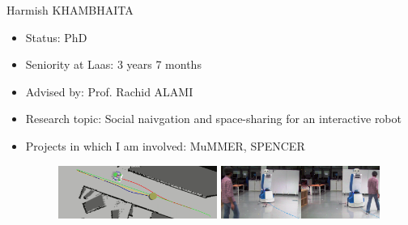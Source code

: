 \documentclass{beamer}
\begin{document}
\begin{frame}{Harmish KHAMBHAITA}
  \begin{itemize}
  \item Status: PhD
  \item Seniority at Laas: 3 years 7 months
  \item Advised by: Prof. Rachid ALAMI
  \item Research topic: Social naivgation and space-sharing for an interactive robot
  \item Projects in which I am involved: MuMMER, SPENCER
    
  \begin{figure}[ht]
    \includegraphics[width=0.49\textwidth]{cooperative.png}
    \includegraphics[width=0.49\textwidth]{legibility.png}
  \end{figure}
\end{itemize}
\end{frame}
\end{document}

